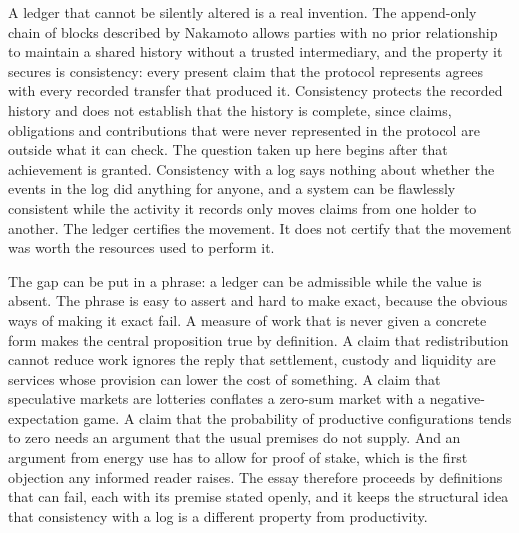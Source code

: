 \documentclass[11pt]{article}
\theoremstyle{remark}
\begin{document}
A ledger that cannot be silently altered is a real invention. The append-only chain of blocks described by Nakamoto \cite{nakamoto2008} allows parties with no prior relationship to maintain a shared history without a trusted intermediary, and the property it secures is consistency: every present claim that the protocol represents agrees with every recorded transfer that produced it. Consistency protects the recorded history and does not establish that the history is complete, since claims, obligations and contributions that were never represented in the protocol are outside what it can check. The question taken up here begins after that achievement is granted. Consistency with a log says nothing about whether the events in the log did anything for anyone, and a system can be flawlessly consistent while the activity it records only moves claims from one holder to another. The ledger certifies the movement. It does not certify that the movement was worth the resources used to perform it.

The gap can be put in a phrase: a ledger can be admissible while the value is absent. The phrase is easy to assert and hard to make exact, because the obvious ways of making it exact fail. A measure of work that is never given a concrete form makes the central proposition true by definition. A claim that redistribution cannot reduce work ignores the reply that settlement, custody and liquidity are services whose provision can lower the cost of something. A claim that speculative markets are lotteries conflates a zero-sum market with a negative-expectation game. A claim that the probability of productive configurations tends to zero needs an argument that the usual premises do not supply. And an argument from energy use has to allow for proof of stake, which is the first objection any informed reader raises. The essay therefore proceeds by definitions that can fail, each with its premise stated openly, and it keeps the structural idea that consistency with a log is a different property from productivity.
\end{document}
